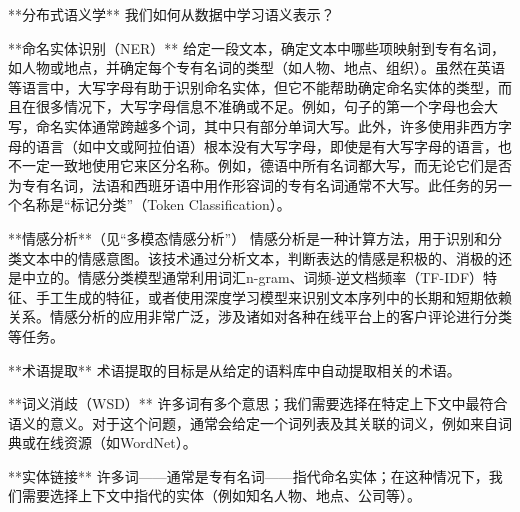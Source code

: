 **分布式语义学**  
我们如何从数据中学习语义表示？

**命名实体识别（NER）**  
给定一段文本，确定文本中哪些项映射到专有名词，如人物或地点，并确定每个专有名词的类型（如人物、地点、组织）。虽然在英语等语言中，大写字母有助于识别命名实体，但它不能帮助确定命名实体的类型，而且在很多情况下，大写字母信息不准确或不足。例如，句子的第一个字母也会大写，命名实体通常跨越多个词，其中只有部分单词大写。此外，许多使用非西方字母的语言（如中文或阿拉伯语）根本没有大写字母，即使是有大写字母的语言，也不一定一致地使用它来区分名称。例如，德语中所有名词都大写，而无论它们是否为专有名词，法语和西班牙语中用作形容词的专有名词通常不大写。此任务的另一个名称是“标记分类”（Token Classification）。

**情感分析**（见“多模态情感分析”）  
情感分析是一种计算方法，用于识别和分类文本中的情感意图。该技术通过分析文本，判断表达的情感是积极的、消极的还是中立的。情感分类模型通常利用词汇n-gram、词频-逆文档频率（TF-IDF）特征、手工生成的特征，或者使用深度学习模型来识别文本序列中的长期和短期依赖关系。情感分析的应用非常广泛，涉及诸如对各种在线平台上的客户评论进行分类等任务。

**术语提取**  
术语提取的目标是从给定的语料库中自动提取相关的术语。

**词义消歧（WSD）**  
许多词有多个意思；我们需要选择在特定上下文中最符合语义的意义。对于这个问题，通常会给定一个词列表及其关联的词义，例如来自词典或在线资源（如WordNet）。

**实体链接**  
许多词——通常是专有名词——指代命名实体；在这种情况下，我们需要选择上下文中指代的实体（例如知名人物、地点、公司等）。